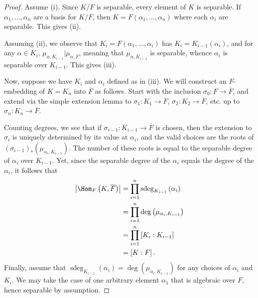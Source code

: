\documentclass[10pt]{mypackage}
\begin{document}
\begin{proof}
  Assume (i). Since $K/F$ is separable, every element of $K$ is separable. If $\alpha_1,\dots,\alpha_n$ are a basis for $K/F$, then $K = F\left( \alpha_1,\dots,\alpha_n \right)$ where each $\alpha_i$ are separable. This gives (ii).

  Assuming (ii), we observe that $K_i = F\left( \alpha_1,\dots,\alpha_i \right)$ has $K_i = K_{i-1}\left( \alpha_i \right)$, and for any $\alpha\in K_i$, $\mu_{\alpha,K_{i-1}} | \mu_{\alpha,F}$, meaning that $\mu_{\alpha,K_{i-1}}$ is separable, whence $\alpha_i$ is separable over $K_{i-1}$. This gives (iii).

  Now, suppose we have $K_i$ and $\alpha_i$ defined as in (iii). We will construct an $F$-embedding of $K = K_n$ into $ \overline{F} $ as follows. Start with the inclusion $\sigma_0\colon F\rightarrow \overline{F}$, and extend via the simple extension lemma to $\sigma_1\colon K_1\rightarrow \overline{F}$, $\sigma_2\colon K_2\rightarrow \overline{F}$, etc. up to $\sigma_n\colon K_n\to \overline{F}$.

  Counting degrees, we see that if $\sigma_{i-1}\colon K_{i-1}\rightarrow \overline{F}$ is chosen, then the extension to $\sigma_i$ is uniquely determined by its value at $\alpha_i$, and the valid choices are the roots of $\left( \sigma_{i-1} \right)_{\ast}\left( \mu_{\alpha_i,K_{i-1}} \right)$. The number of these roots is equal to the separable degree of $\alpha_i$ over $K_{i-1}$. Yet, since the separable degree of the $\alpha_i$ equals the degree of the $\alpha_i$, it follows that
  \begin{align*}
    \left\vert \Hom_F\left( K, \overline{F} \right) \right\vert &= \prod_{i=1}^{n} \operatorname{sdeg}_{K_{i-1}}\left( \alpha_i \right)\\
                                                                &= \prod_{i=1}^{n} \deg \left( \mu_{\alpha_i,K_{i-1}} \right)\\
                                                                &= \prod_{i=1}^{n} \left[ K_i:K_{i-1} \right]\\
                                                                &= \left[ K:F \right].
  \end{align*}
  Finally, assume that $\operatorname{sdeg}_{K_{i-1}}\left(\alpha_i\right) = \deg \left( \mu_{\alpha_i,K_{i-1}} \right)$ for any choices of $\alpha_i$ and $K_i$. We may take the case of one arbitrary element $\alpha_1$ that is algebraic over $F$, hence separable by assumption.
\end{proof}
\end{document}
